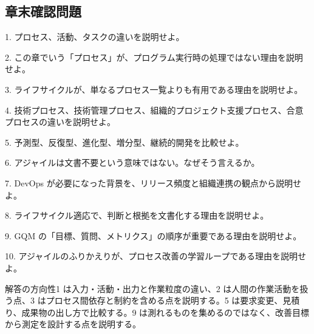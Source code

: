 \subsection{章末確認問題}
1. プロセス、活動、タスクの違いを説明せよ。

2. この章でいう「プロセス」が、プログラム実行時の処理ではない理由を説明せよ。

3. ライフサイクルが、単なるプロセス一覧よりも有用である理由を説明せよ。

4. 技術プロセス、技術管理プロセス、組織的プロジェクト支援プロセス、合意プロセスの違いを説明せよ。

5. 予測型、反復型、進化型、増分型、継続的開発を比較せよ。

6. アジャイルは文書不要という意味ではない。なぜそう言えるか。

7. DevOps が必要になった背景を、リリース頻度と組織連携の観点から説明せよ。

8. ライフサイクル適応で、判断と根拠を文書化する理由を説明せよ。

9. GQM の「目標、質問、メトリクス」の順序が重要である理由を説明せよ。

10. アジャイルのふりかえりが、プロセス改善の学習ループである理由を説明せよ。

\begin{pointbox}{解答の方向性}1 は入力・活動・出力と作業粒度の違い、2 は人間の作業活動を扱う点、3 はプロセス間依存と制約を含める点を説明する。5 は要求変更、見積り、成果物の出し方で比較する。9 は測れるものを集めるのではなく、改善目標から測定を設計する点を説明する。\end{pointbox}
